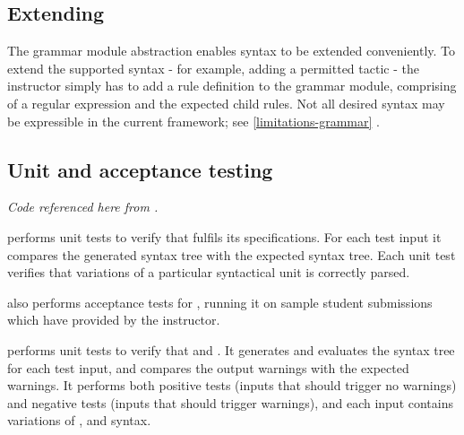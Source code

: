 \subsection{Extending }
\label{extending}
The grammar module abstraction enables syntax to be extended conveniently. To extend the supported syntax - for example, adding a permitted tactic - the instructor simply has to add a rule definition to the grammar module, comprising of a regular expression and the expected child rules. Not all desired syntax may be expressible in the current framework; see \ref{limitations-grammar} .

\subsection{Unit and acceptance testing}
\emph{Code referenced here from .}

 performs unit tests to verify that  fulfils its specifications. For each test input it compares the generated syntax tree with the expected syntax tree. Each unit test verifies that variations of a particular syntactical unit is correctly parsed.

 also performs acceptance tests for , running it on sample student submissions which have provided by the instructor.

 performs unit tests to verify that  and . It generates and evaluates the syntax tree for each test input, and compares the output warnings with the expected warnings. It performs both positive tests (inputs that should trigger no warnings) and negative tests (inputs that should trigger warnings), and each input contains variations of ,  and  syntax.